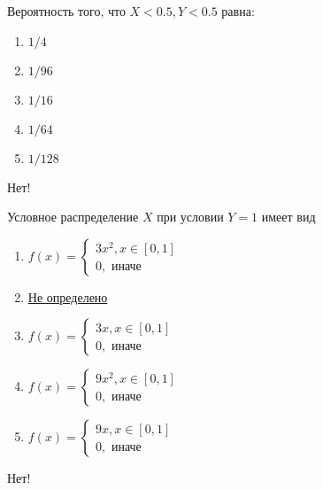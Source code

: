 \documentclass[t]{beamer}
\begin{document}
 \begin{frame} \label{33-No} 
\begin{block}{33} 

 Вероятность того, что $X<0.5, Y<0.5$ равна:
  


 \end{block} 
\begin{enumerate} 
\item[] \hyperlink{33-No}{\beamergotobutton{} $1/4$}
\item[] \hyperlink{33-No}{\beamergotobutton{} $1/96$}
\item[] \hyperlink{33-No}{\beamergotobutton{} $1/16$}
\item[] \hyperlink{33-Yes}{\beamergotobutton{} $1/64$}
\item[] \hyperlink{33-No}{\beamergotobutton{} $1/128$}
\end{enumerate} 

 \alert{Нет!} 
\end{frame} 


 \begin{frame} \label{34-No} 
\begin{block}{34} 

  Условное распределение $X$ при условии $Y=1$ имеет вид
  


 \end{block} 
\begin{enumerate} 
\item[] \hyperlink{34-Yes}{\beamergotobutton{} $ f(x) = \begin{cases}
	3 x^2 , x \in [0,1] \\
	0,\text{ иначе}
	\end{cases} $}
\item[] \hyperlink{34-No}{\beamergotobutton{} Не определено}
\item[] \hyperlink{34-No}{\beamergotobutton{} $ f(x) = \begin{cases}
	3 x , x \in [0,1] \\
	0,\text{ иначе}
	\end{cases}  $}
\item[] \hyperlink{34-No}{\beamergotobutton{} $ f(x) = \begin{cases}
	9 x^2 , x \in [0,1] \\
	0,\text{ иначе}
	\end{cases}  $}
\item[] \hyperlink{34-No}{\beamergotobutton{} $ f(x) = \begin{cases}
	9 x , x \in [0,1] \\
	0,\text{ иначе}
	\end{cases}  $}
\end{enumerate} 

 \alert{Нет!} 
\end{frame} 
\end{document}
